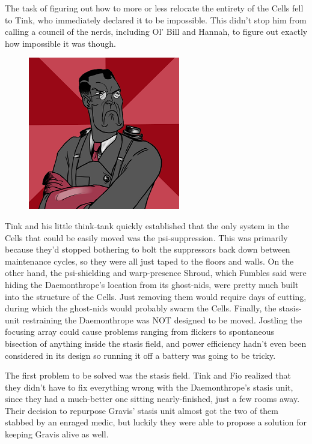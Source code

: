 The task of figuring out how to more or less relocate the entirety of the Cells fell to Tink, who immediately declared it to be impossible. 
This didn't stop him from calling a council of the nerds, including Ol' Bill and Hannah, to figure out exactly how impossible it was though.

\begin{figure}
	\begin{center}
		\includegraphics[width=\figwidth]{pics/15/43.png}
	\end{center}
\end{figure}
Tink and his little think-tank quickly established that the only system in the Cells that could be easily moved was the psi-suppression. 
This was primarily because they'd stopped bothering to bolt the suppressors back down between maintenance cycles, so they were all just taped to the floors and walls. 
On the other hand, the psi-shielding and warp-presence Shroud, which Fumbles said were hiding the Daemonthrope's location from its ghost-nids, were pretty much built into the structure of the Cells. 
Just removing them would require days of cutting, during which the ghost-nids would probably swarm the Cells. 
Finally, the stasis-unit restraining the Daemonthrope was NOT designed to be moved. 
Jostling the focusing array could cause problems ranging from flickers to spontaneous bisection of anything inside the stasis field, and power efficiency hadn't even been considered in its design so running it off a battery was going to be tricky.

The first problem to be solved was the stasis field. 
Tink and Fio realized that they didn’t have to fix everything wrong with the Daemonthrope’s stasis unit, since they had a much-better one sitting nearly-finished, just a few rooms away. 
Their decision to repurpose Gravis’ stasis unit almost got the two of them stabbed by an enraged medic, but luckily they were able to propose a solution for keeping Gravis alive as well. 



